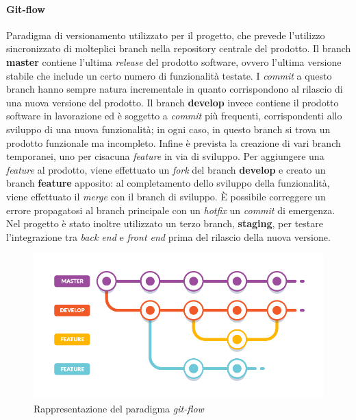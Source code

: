 \paragraph{Git-flow} Paradigma di versionamento utilizzato per il progetto, che prevede l'utilizzo sincronizzato di molteplici branch nella repository centrale del prodotto. Il branch \textbf{master} contiene l'ultima \textit{release} del prodotto software, ovvero l'ultima versione stabile che include un certo numero di funzionalità testate. I \textit{commit} a questo branch hanno sempre natura incrementale in quanto corrispondono al rilascio di una nuova versione del prodotto. Il branch \textbf{develop} invece contiene il prodotto software in lavorazione ed è soggetto a \textit{commit} più frequenti, corrispondenti allo sviluppo di una nuova funzionalità; in ogni caso, in questo branch si trova un prodotto funzionale ma incompleto. Infine è prevista la creazione di vari branch temporanei, uno per cisacuna \textit{feature} in via di sviluppo. Per aggiungere una \textit{feature} al prodotto, viene effettuato un \textit{fork} del branch \textbf{develop} e creato un branch  \textbf{feature} apposito: al completamento dello sviluppo della funzionalità, viene effettuato il \textit{merge} con il branch di sviluppo. È possibile correggere un errore propagatosi al branch principale con un \textit{hotfix} un \textit{commit} di emergenza.
Nel progetto è stato inoltre utilizzato un terzo branch, \textbf{staging}, per testare l'integrazione tra \textit{back end} e \textit{front end} prima del rilascio della nuova versione.

\begin{figure}[h!]
    \includegraphics[width=\textwidth]{figures/gitflow-1.png}
    \caption[Rappresentazione del paradigma \textit{git-flow}]{Rappresentazione del paradigma \textit{git-flow}
    \label{fig:gitflow}}
\end{figure}    

